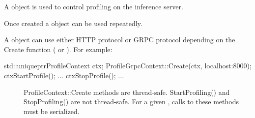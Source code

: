 \documentclass[letterpaper,10pt,english]{sphinxmanual}
\begin{document}
\begin{fulllineitems}
\label{\detokenize{cpp_api/classnvidia_1_1inferenceserver_1_1client_1_1ProfileContext:_CPPv4N6nvidia15inferenceserver6client14ProfileContextE}}%
\pysigstartmultiline
{}\label{\detokenize{cpp_api/classnvidia_1_1inferenceserver_1_1client_1_1ProfileContext:classnvidia_1_1inferenceserver_1_1client_1_1ProfileContext}}%
\pysigstopmultiline
A {\hyperref[\detokenize{cpp_api/classnvidia_1_1inferenceserver_1_1client_1_1ProfileContext:classnvidia_1_1inferenceserver_1_1client_1_1ProfileContext}]{}} object is used to control profiling on the inference server. 

Once created a {\hyperref[\detokenize{cpp_api/classnvidia_1_1inferenceserver_1_1client_1_1ProfileContext:classnvidia_1_1inferenceserver_1_1client_1_1ProfileContext}]{}} object can be used repeatedly.

A {\hyperref[\detokenize{cpp_api/classnvidia_1_1inferenceserver_1_1client_1_1ProfileContext:classnvidia_1_1inferenceserver_1_1client_1_1ProfileContext}]{}} object can use either HTTP protocol or GRPC protocol depending on the Create function ({\hyperref[\detokenize{cpp_api/classnvidia_1_1inferenceserver_1_1client_1_1ProfileHttpContext:classnvidia_1_1inferenceserver_1_1client_1_1ProfileHttpContext_1a5a4cab76d0a3f8af074883be690ca8d5}]{}} or {\hyperref[\detokenize{cpp_api/classnvidia_1_1inferenceserver_1_1client_1_1ProfileGrpcContext:classnvidia_1_1inferenceserver_1_1client_1_1ProfileGrpcContext_1aea9bbc1359b9e491afcbe066386a8baa}]{}}). For example:


\begin{sphinxVerbatim}[commandchars=\\\{\}]
std::unique\PYGZus{}ptr\PYGZlt{}ProfileContext\PYGZgt{} ctx;
ProfileGrpcContext::Create(\PYGZam{}ctx, \PYGZdq{}localhost:8000\PYGZdq{});
ctx\PYGZhy{}\PYGZgt{}StartProfile();
...
ctx\PYGZhy{}\PYGZgt{}StopProfile();
...
\end{sphinxVerbatim}


\begin{description}
\item[{}] \leavevmode
ProfileContext::Create methods are thread-safe. StartProfiling() and StopProfiling() are not thread-safe. For a given {\hyperref[\detokenize{cpp_api/classnvidia_1_1inferenceserver_1_1client_1_1ProfileContext:classnvidia_1_1inferenceserver_1_1client_1_1ProfileContext}]{}}, calls to these methods must be serialized. 


\end{description}
\end{fulllineitems}
\end{document}
